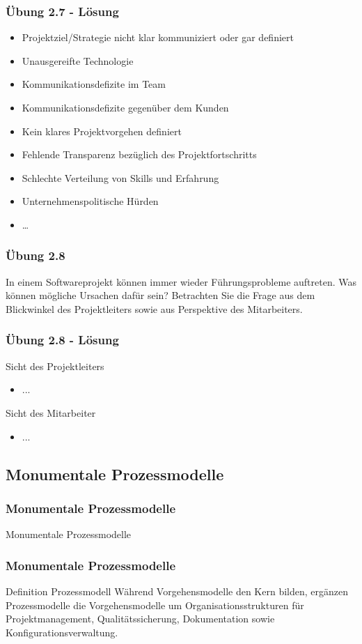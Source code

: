 \ifloesung
\begin{frame}[fragile]
\frametitle{Übung 2.7 - Lösung}
	\begin{itemize}
		\item Projektziel/Strategie nicht klar kommuniziert oder gar definiert
		\item Unausgereifte Technologie
		\item Kommunikationsdefizite im Team 
		\item Kommunikationsdefizite gegenüber dem Kunden
		\item Kein klares Projektvorgehen definiert
		\item Fehlende Transparenz bezüglich des Projektfortschritts
		\item Schlechte Verteilung von Skills und Erfahrung
		\item Unternehmenspolitische Hürden
		\item \ldots
	\end{itemize}
\end{frame}
\fi

\begin{frame}
\frametitle{Übung 2.8}
	In einem Softwareprojekt können immer wieder Führungsprobleme auftreten.
	Was können mögliche Ursachen dafür sein? Betrachten Sie die Frage aus dem 
	Blickwinkel des Projektleiters sowie aus Perspektive des Mitarbeiters.
\end{frame}

\ifloesung
\begin{frame}[fragile]
\frametitle{Übung 2.8 - Lösung}
	Sicht des Projektleiters
	\begin{itemize}
		\item ...
	\end{itemize}
	\bigskip
	Sicht des Mitarbeiter
	\begin{itemize}
		\item ...
	\end{itemize}
\end{frame}
\fi

\subsection{Monumentale Prozessmodelle}
\begin{frame}
\frametitle{Monumentale Prozessmodelle}
\huge Monumentale Prozessmodelle
\end{frame}

\begin{frame}
\frametitle{Monumentale Prozessmodelle}
	\begin{block}{Definition Prozessmodell}
		Während Vorgehensmodelle den Kern bilden, ergänzen Prozessmodelle die Vorgehensmodelle um 
		Organisationsstrukturen für Projektmanagement, Qualitätssicherung, Dokumentation sowie 
		Konfigurationsverwaltung.
	\end{block}
\end{frame}

